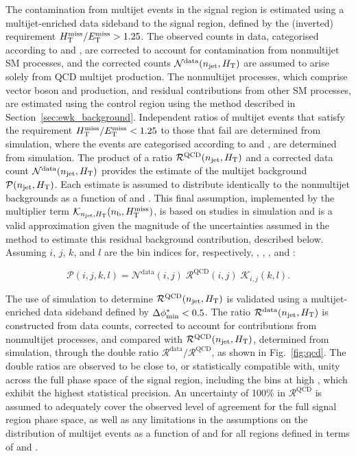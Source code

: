 The contamination from multijet events in the signal region is
estimated using a multijet-enriched data sideband to the signal
region, defined by the (inverted) requirement $\mhtmet > 1.25$. The
observed counts in data, categorised according to \njet and \scalht,
are corrected to account for contamination from nonmultijet SM
processes, and the corrected counts $\mathcal{N}^\text{data}(\njet,
\scalht)$ are assumed to arise solely from QCD multijet
production. The nonmultijet processes, which comprise vector boson and
\ttbar production, and residual contributions from other SM processes,
are estimated using the \mj control region using the method described
in Section~\ref{sec:ewk_background}. Independent ratios of multijet
events that satisfy the requirement $\mhtmet < 1.25$ to those that
fail are determined from simulation, where the events are categorised
according to \njet and \scalht, are determined from simulation. The
product of a ratio $\mathcal{R}^\text{QCD}(\njet, \scalht)$ and a
corrected data count $\mathcal{N}^\text{data}(\njet, \scalht)$
provides the estimate of the multijet background $\mathcal{P}(\njet,
\scalht)$. Each estimate is assumed to distribute identically to the
nonmultijet backgrounds as a function of \nb and \HTmiss. This final
assumption, implemented by the multiplier term $\mathcal{K}_{\njet,
  \scalht}(\nb, \HTmiss)$, is based on studies in simulation and is a
valid approximation given the magnitude of the uncertainties assumed
in the method to estimate this residual background contribution,
described below. 
Assuming $i$, $j$, $k$, and $l$ are the bin indices for, respectively,
\njet, \scalht, \nb, and \HTmiss:

\begin{equation}
  \label{eq:qcd}
  \mathcal{P}( i, j, k, l ) =
  \mathcal{N}^\text{data}( i, j )\;
  \mathcal{R}^\text{QCD}( i, j )\;
  \mathcal{K}_{i,j}( k, l ).
\end{equation}

The use of simulation to determine $\mathcal{R}^\text{QCD}(\njet,
\scalht)$ is validated using a multijet-enriched data sideband defined
by $\bdphi < 0.5$.
The ratio $\mathcal{R}^\text{data}(\njet, \scalht)$ is constructed
from data counts, corrected to account for contributions from
nonmultijet processes, and compared with
$\mathcal{R}^\text{QCD}(\njet, \scalht)$, determined from simulation,
through the double ratio
$\mathcal{R}^\text{data}/\mathcal{R}^\text{QCD}$, as shown in
Fig.~\ref{fig:qcd}. The double ratios are observed to be close to, or
statistically compatible with, unity across the full phase space of
the signal region, including the bins at high \scalht, which exhibit
the highest statistical precision. An uncertainty of 100\% in
$\mathcal{R}^\text{QCD}$ is assumed to adequately cover the observed
level of agreement for the full signal region phase space, as well as
any limitations in the assumptions on the distribution of multijet
events as a function of \nb and \HTmiss for all regions defined in
terms of \njet and \scalht.


